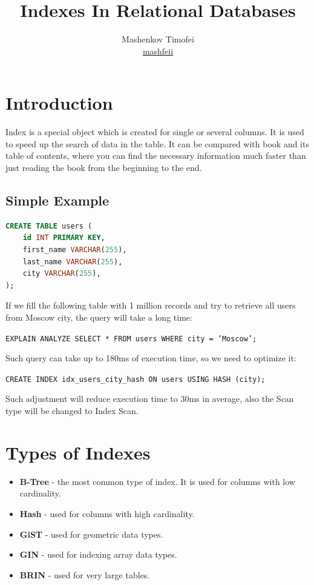 \documentclass{article}
\title{Indexes In Relational Databases}
\author{Mashenkov Timofei \\ \href{t.me/mashfeii}{mashfeii}}
\newcommand{\code}[1]{\colorbox{light-gray}{\texttt{#1}}}
\begin{document}
\maketitle{}

\section{Introduction}

Index is a special object which is created for single or several columns. It is used to speed up the search of data in the table. It can be compared with book and its table of contents, where you can find the necessary information much faster than just reading the book from the beginning to the end.

\subsection{Simple Example}
\noindent

\begin{lstlisting}[language=SQL, caption={Simple example of table creation}]
CREATE TABLE users (
    id INT PRIMARY KEY,
    first_name VARCHAR(255),
    last_name VARCHAR(255),
    city VARCHAR(255),
);
\end{lstlisting}

If we fill the following table with 1 million records and try to retrieve all users from Moscow city, the query will take a long time: \newline

\code{EXPLAIN ANALYZE SELECT * FROM users WHERE city = 'Moscow';} \newline

Such query can take up to 180ms of execution time, so we need to optimize it: \newline

\code{CREATE INDEX idx\_users\_city\_hash ON users USING HASH (city);} \newline

Such adjustment will reduce execution time to 30ms in average, also the Scan type will be changed to Index Scan.

\section{Types of Indexes}

\begin{itemize}
  \item \textbf{B-Tree} - the most common type of index. It is used for columns with low cardinality.
  \item \textbf{Hash} - used for columns with high cardinality.
  \item \textbf{GiST} - used for geometric data types.
  \item \textbf{GIN} - used for indexing array data types.
  \item \textbf{BRIN} - used for very large tables.
\end{itemize}
\end{document}
